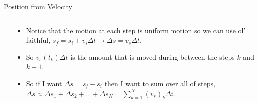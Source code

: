 \documentclass{beamer}
\begin{document}
\begin{frame}{Position from Velocity}
{\begin{columns}
\begin{column}{0.2\textwidth}
\end{column}
\begin{column}{0.8\textwidth}
   \begin{itemize}
      \item Notice that the motion at each step is uniform motion so we can use ol' faithful, $s_f = s_i + v_s \Delta t \rightarrow \Delta s = v_s \Delta t$.
      \item<3-> So $v_s(t_k)\Delta t$ is the amount that is moved during between the steps $k$ and $k+1$.
      \item<4-> So if I want $\Delta s = s_f - s_i$ then I want to sum over all of steps, $\Delta s \approx \Delta s_1 + \Delta s_2 + \ldots + \Delta s_N = \sum\limits_{k=1}^N (v_s)_k\Delta t$.
   \end{itemize}
\end{column}
\end{columns}}
\end{frame}
\end{document}
